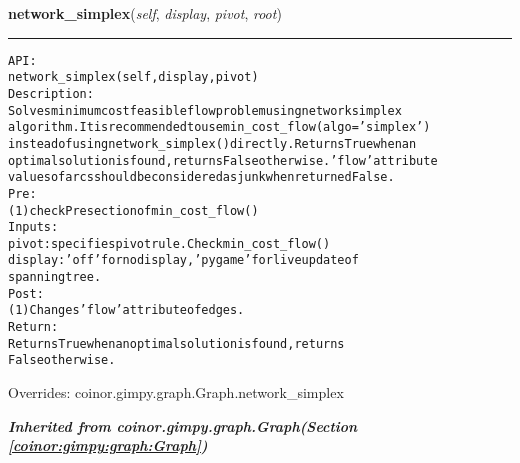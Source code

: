 \hspace{.8\funcindent}\begin{boxedminipage}{\funcwidth}

    \raggedright \textbf{network\_simplex}(\textit{self}, \textit{display}, \textit{pivot}, \textit{root})

    \vspace{-1.5ex}

    \rule{\textwidth}{0.5\fboxrule}
\setlength{\parskip}{2ex}
\begin{alltt}

API:
    network\_simplex(self, display, pivot)
Description:
    Solves minimum cost feasible flow problem using network simplex
    algorithm. It is recommended to use min\_cost\_flow(algo='simplex')
    instead of using network\_simplex() directly. Returns True when an
    optimal solution is found, returns False otherwise. 'flow' attribute
    values of arcs should be considered as junk when returned False.
Pre:
    (1) check Pre section of min\_cost\_flow()
Inputs:
    pivot: specifies pivot rule. Check min\_cost\_flow()
    display: 'off' for no display, 'pygame' for live update of
    spanning tree.
Post:
    (1) Changes 'flow' attribute of edges.
Return:
    Returns True when an optimal solution is found, returns
    False otherwise.
\end{alltt}

\setlength{\parskip}{1ex}
      Overrides: coinor.gimpy.graph.Graph.network\_simplex

    \end{boxedminipage}


\large{\textbf{\textit{Inherited from coinor.gimpy.graph.Graph\textit{(Section \ref{coinor:gimpy:graph:Graph})}}}}

